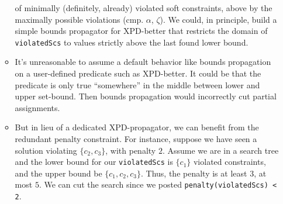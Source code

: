 \begin{enumerate}
\begin{itemize}
of minimally (definitely, already) violated soft constraints, above by the maximally possible violations (cmp. $\alpha$, $\zeta$).
We could, in principle, build a simple bounds propagator for XPD-better that restricts the domain of  \texttt{violatedScs}
to values strictly above the last found lower bound.
\item It's unreasonable to assume a default behavior like bounds propagation on a user-defined predicate such as XPD-better.
It could be that the predicate is only true ``somewhere'' in the middle between lower and upper set-bound. Then bounds propagation
would incorrectly cut partial assignments.
\item But in lieu of a dedicated XPD-propagator, we can benefit from the redundant penalty constraint. For instance, suppose 
we have seen a solution violating $\{c_2,c_3\}$, with penalty $2$. Assume we are in a search tree and the lower bound for our \texttt{violatedScs}
is $\{c_1\}$ violated constraints, and the upper bound be $\{c_1,c_2,c_3\}$. Thus, the penalty is at least $3$, at most $5$. We can cut the
search since we posted \texttt{penalty(violatedScs) < 2}.
\end{itemize}
\end{enumerate}